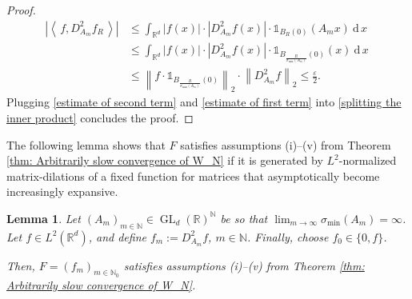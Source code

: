 \documentclass[11pt]{amsart}
\newcommand{\R}{{\mathbb{R}}}
\newcommand{\N}{\mathbb{N}}
\newcommand{\dx}{\:\mathrm{d}\,x\:}
\newcommand{\norm}[1]{\ensuremath{\left\lVert\text{}#1\text{}\right\rVert}}
\newcommand{\ip}[1]{\ensuremath{\left<\text{} \, #1 \, \text{}\right>}}
\DeclareMathOperator{\GL}{GL}
\newtheorem{lemma}[theorem]{Lemma}
\newenvironment{proof sketch} {\textit{Proof sketch.}}{}
\begin{document}
\begin{proof}
\begin{align}
      \left|\ip{f,D_{A_m}^2f_R}\right| & \leq
      \int_{\R^d} |f(x)| \cdot |D_{A_m}^2f(x)| \cdot \mathds{1}_{B_R(0)}(A_mx) \dx \nonumber \\
      & \leq \int_{\R^d} |f(x)| \cdot |D_{A_m}^2f(x)| \cdot \mathds{1}_{B_\frac{R}{\sigma_{\text{min}}(A_m)}(0)}(x) \dx \nonumber        \\
      & \leq \norm{f \cdot \mathds{1}_{B_\frac{R}{\sigma_{\text{min}}(A_m)}(0)}}_2 \cdot \norm{D_{A_m}^2f}_2 \leq \frac{\varepsilon}{2}.
    \end{align}
    Plugging \eqref{estimate of second term} and \eqref{estimate of first term} into \eqref{splitting the inner product} concludes the proof.
  \end{proof}
  
  The following lemma shows that $F$ satisfies assumptions (i)--(v) from Theorem \ref{thm: Arbitrarily slow convergence of W_N} if it is generated by $L^2$-normalized matrix-dilations of a fixed function for matrices that asymptotically become increasingly expansive.
  
  \begin{lemma}\label{lem: Matrix dilations satisfy assumptions for approx add}
    Let $(A_m)_{m \in \N} \in \GL_d(\R)^\N$ be so that $\lim_{m \to \infty}\sigma_{\text{min}}(A_m)=\infty$. Let $f \in L^2(\R^d)$, and define $f_m:=D_{A_m}^2f$, $m \in \N$. Finally, choose $f_0 \in \{0,f\}$.
    
    Then, $F=(f_m)_{m \in \N_0}$ satisfies assumptions (i)--(v) from Theorem \ref{thm: Arbitrarily slow convergence of W_N}.
  \end{lemma}
  
\end{document}
